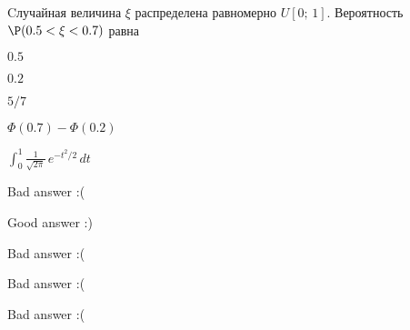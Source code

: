 
\begin{question}
Cлучайная величина \(\xi\) распределена равномерно \(U[0;\,1]\).
Вероятность \(\P(0.5<\xi<0.7)\) равна
\begin{answerlist}
  \item \(0.5\)
  \item \(0.2\)
  \item \(5/7\)
  \item \(\Phi(0.7) - \Phi(0.2)\)
  \item \(\int_{0}^{1}\frac{1}{\sqrt{2\pi}}\,e^{-t^2/2}\,dt\)
\end{answerlist}
\end{question}

\begin{solution}
\begin{answerlist}
  \item Bad answer :(
  \item Good answer :)
  \item Bad answer :(
  \item Bad answer :(
  \item Bad answer :(
\end{answerlist}
\end{solution}

